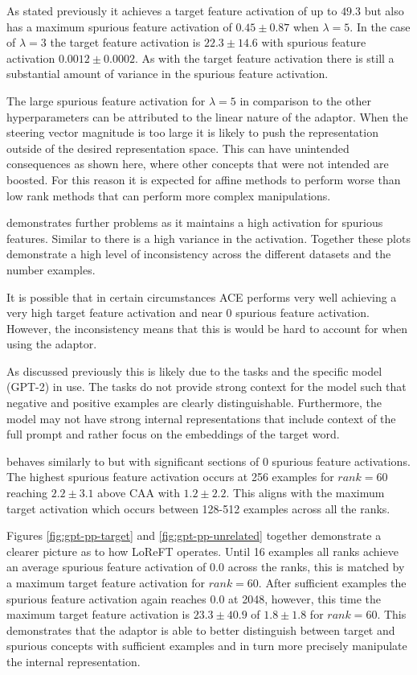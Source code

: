 As stated previously it achieves a target feature activation of up to $49.3$ but also has a maximum spurious feature activation of $0.45 \pm 0.87$ when $\lambda = 5$.
In the case of $\lambda = 3$ the target feature activation is $22.3 \pm 14.6$ with spurious feature activation $0.0012 \pm 0.0002$.
As with the target feature activation there is still a substantial amount of variance in the spurious feature activation.

The large spurious feature activation for $\lambda = 5$ in comparison to the other hyperparameters can be attributed to the linear nature of the adaptor.
When the steering vector magnitude is too large it is likely to push the representation outside of the desired representation space.
This can have unintended consequences as shown here, where other concepts that were not intended are boosted.
For this reason it is expected for affine methods to perform worse than low rank methods that can perform more complex manipulations.

 demonstrates further problems as it maintains a high activation for spurious features.
Similar to  there is a high variance in the activation.
Together these plots demonstrate a high level of inconsistency across the different datasets and the number examples.

It is possible that in certain circumstances ACE performs very well achieving a very high target feature activation and near 0 spurious feature activation.
However, the inconsistency means that this is would be hard to account for when using the adaptor.

As discussed previously this is likely due to the tasks and the specific model (GPT-2) in use.
The tasks do not provide strong context for the model such that negative and positive examples are clearly distinguishable.
Furthermore, the model may not have strong internal representations that include context of the full prompt and rather focus on the embeddings of the target word.

 behaves similarly to  but with significant sections of 0 spurious feature activations.
The highest spurious feature activation occurs at 256 examples for $rank = 60$ reaching $2.2 \pm 3.1$ above CAA with $1.2 \pm 2.2$.
This aligns with the maximum target activation which occurs between 128-512 examples across all the ranks.

Figures \ref{fig:gpt-pp-target} and \ref{fig:gpt-pp-unrelated} together demonstrate a clearer picture as to how LoReFT operates.
Until 16 examples all ranks achieve an average spurious feature activation of $0.0$ across the ranks, this is matched by a maximum target feature activation for $rank = 60$.
After sufficient examples the spurious feature activation again reaches $0.0$ at 2048, however, this time the maximum target feature activation is $23.3 \pm 40.9$ of $1.8 \pm 1.8$ for $rank = 60$.
This demonstrates that the adaptor is able to better distinguish between target and spurious concepts with sufficient examples and in turn more precisely manipulate the internal representation.

